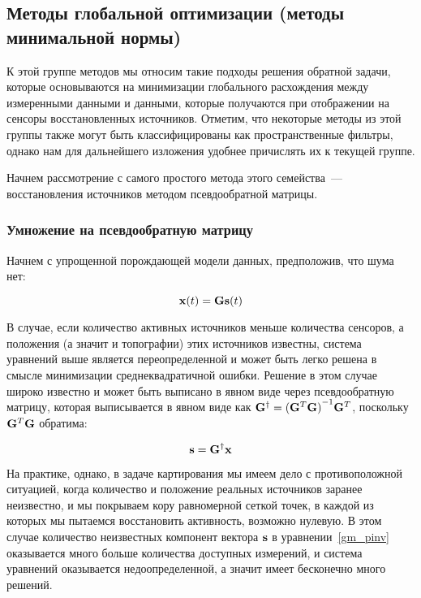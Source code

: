 \subsection{Методы глобальной оптимизации (методы минимальной нормы)}

К этой группе методов мы относим такие подходы решения обратной задачи,
которые основываются на минимизации глобального расхождения между измеренными данными
и данными, которые получаются при отображении на сенсоры восстановленных источников.
Отметим, что некоторые методы из этой группы также могут быть классифицированы как
пространственные фильтры, однако нам для дальнейшего изложения удобнее причислять их к
текущей группе.

Начнем рассмотрение с самого простого метода этого семейства~--- восстановления источников методом
псевдообратной матрицы.

\subsubsection{Умножение на псевдообратную матрицу}

Начнем с упрощенной порождающей модели данных, предположив, что шума нет: 

\begin{equation}
    \mathbf{x}(t) = \mathbf{G} \mathbf{s}(t)
    \label{gm_pinv}
\end{equation}

В случае, если количество активных источников меньше количества сенсоров,
а положения (а значит и топографии) этих источников известны, система
уравнений выше является переопределенной и может быть легко решена в смысле
минимизации среднеквадратичной ошибки.
Решение в этом случае широко известно и может быть выписано в явном виде
через псевдообратную матрицу, которая выписывается в явном виде как
$\mathbf{G}^\dagger = {(\mathbf{G}^T\mathbf{G})}^{-1}\mathbf{G}^T$, поскольку $\mathbf{G}^T\mathbf{G}$ обратима:

\begin{equation*}
    \mathbf{s} = \mathbf{G}^\dagger\mathbf{x}
\end{equation*}

На практике, однако, в задаче картирования мы имеем дело с противоположной ситуацией,
когда количество и положение реальных источников заранее неизвестно, и мы
покрываем кору равномерной сеткой точек, в каждой из которых мы пытаемся восстановить активность,
возможно нулевую. В этом случае количество неизвестных компонент вектора $\mathbf{s}$ в уравнении~\ref{gm_pinv}
оказывается много больше количества доступных измерений,
и система уравнений оказывается недоопределенной, а значит имеет бесконечно много решений.

